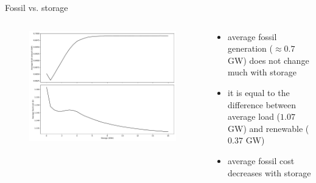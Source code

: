 \documentclass[aspectratio=169,11pt]{beamer}
\begin{document}
\begin{frame}{Fossil vs. storage}
\begin{columns}
    \begin{column}{0.6\textwidth}
        \begin{figure}
            \centering
            \includegraphics[width=\columnwidth]{./figures/p2.pdf}
        \end{figure}
    \end{column}
    \begin{column}{0.4\textwidth}
        \begin{itemize}
            \item average fossil generation ($\approx 0.7$ GW) does not change much with storage
            \item it is equal to the difference between average load ($1.07$ GW) and renewable ($0.37$ GW)
            \item average fossil cost decreases with storage
        \end{itemize}
    \end{column}
\end{columns}
\end{frame}
\end{document}
